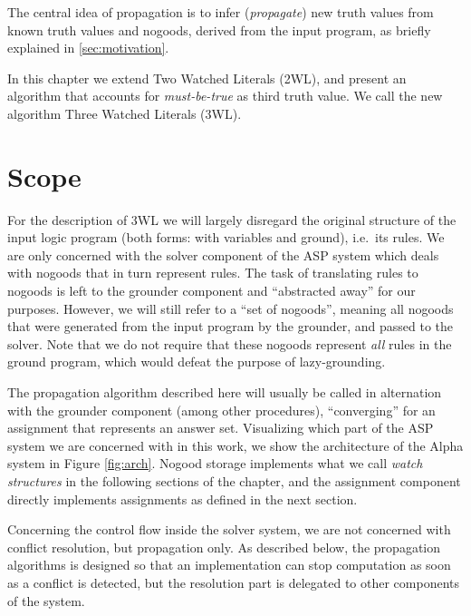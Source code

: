 \documentclass{vutinfth} %
\newcommand{\mbt}{must-be-true\xspace}
\begin{document}
The central idea of propagation is to infer (\emph{propagate}) new truth values from known truth values and nogoods, derived from the input program, as briefly explained in \ref{sec:motivation}. 

In this chapter we extend Two Watched Literals (2WL), and present an algorithm that accounts for \emph{\mbt} as third truth value. We call the new algorithm Three Watched Literals (3WL).

\section{Scope}

For the description of 3WL we will largely disregard the original structure of the input logic program (both forms: with variables and ground), i.e.~its rules. We are only concerned with the solver component of the ASP system which deals with nogoods that in turn represent rules. The task of translating rules to nogoods is left to the grounder component and \enquote{abstracted away} for our purposes. However, we will still refer to a \enquote{set of nogoods}, meaning all nogoods that were generated from the input program by the grounder, and passed to the solver. Note that we do not require that these nogoods represent \emph{all} rules in the ground program, which would defeat the purpose of lazy-grounding.

The propagation algorithm described here will usually be called in alternation with the grounder component (among other procedures), \enquote{converging} for an assignment that represents an answer set. Visualizing which part of the ASP system we are concerned with in this work, we show the architecture of the Alpha system in Figure \ref{fig:arch}. Nogood storage implements what we call \emph{watch structures} in the following sections of the chapter, and the assignment component directly implements assignments as defined in the next section.

Concerning the control flow inside the solver system, we are not concerned with conflict resolution, but propagation only. As described below, the propagation algorithms is designed so that an implementation can stop computation as soon as a conflict is detected, but the resolution part is delegated to other components of the system.
\end{document}
